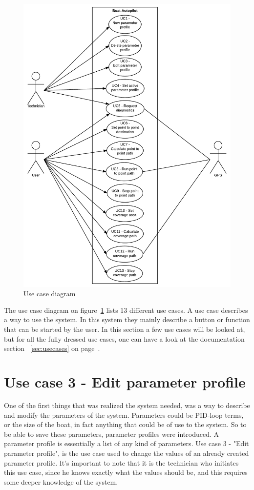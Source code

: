 \begin{figure}[h]
\centering
\includegraphics[width=0.7\linewidth]{../Appendix/Project/Dokumentation/Images/Requirements_specification/Usecase_diagram}
\caption{Use case diagram}
\label{fig:usecasediagram}
\end{figure}

The use case diagram on figure~\ref{fig:usecasediagram} lists 13 different use cases. A use case describes a way to use the system. In this system they mainly describe a button or function that can be started by the user. In this section a few use cases will be looked at, but for all the fully dressed use cases, one can have a look at the documentation section ~\ref{sec:usecases} on page~\pageref{sec:usecases}.

\section{Use case 3 - Edit parameter profile}
One of the first things that was realized the system needed, was a way to describe and modify the parameters of the system. Parameters could be PID-loop terms, or the size of the boat, in fact anything that could be of use to the system. So to be able to save these parameters, parameter profiles were introduced. A parameter profile is essentially a list of any kind of parameters. Use case 3 - "Edit parameter profile", is the use case used to change the values of an already created parameter profile. It's important to note that it is the technician who initiates this use case, since he knows exactly what the values should be, and this requires some deeper knowledge of the system. 

